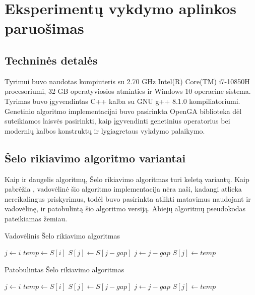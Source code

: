 \documentclass{VUMIFInfKursinis}
\begin{document}
\section{Eksperimentų vykdymo aplinkos paruošimas}

\subsection{Techninės detalės}
Tyrimui buvo naudotas kompiuteris su 2.70 GHz Intel(R) Core(TM) i7-10850H procesoriumi,
32 GB operatyviosios atminties ir Windows 10 operacine sistema.
Tyrimas buvo įgyvendintas C++ kalba su GNU g++ 8.1.0 kompiliatoriumi.
Genetinio algoritmo implementacijai buvo pasirinkta OpenGA biblioteka \cite{mohammadi2017openga}
dėl suteikiamos laisvės pasirinkti, kaip įgyvendinti genetinius operatorius bei modernių kalbos konstruktų ir lygiagretaus vykdymo palaikymo.

\subsection{Šelo rikiavimo algoritmo variantai}

Kaip ir daugelis algoritmų, Šelo rikiavimo algoritmas turi keletą variantų.
Kaip pabrėžia \cite{Radavičius_Baranauskas_2013}, vadovėlinė šio algoritmo implementacija nėra
naši, kadangi atlieka nereikalingus priskyrimus,
todėl buvo pasirinkta atlikti matavimus naudojant ir vadovėlinę, ir patobulintą šio algoritmo versiją.
Abiejų algoritmų pseudokodas pateikiamas žemiau.

\begin{algorithm}
  \caption{Vadovėlinis Šelo rikiavimo algoritmas}\label{css} %
  \begin{algorithmic}[1]
      \State $j\gets i$
      \State $temp\gets S[i]$
        \State $S[j]\gets S[j - gap]$
        \State $j\gets j-gap$
      \EndWhile
      \State $S[j]\gets temp$
    \EndFor
  \EndFor
  \end{algorithmic}
\end{algorithm}

\begin{algorithm}
  \caption{Patobulintas Šelo rikiavimo algoritmas}\label{iss}
  \begin{algorithmic}[1]
        \State $j\gets i$
        \State $temp\gets S[i]$
        \Repeat
          \State $S[j]\gets S[j - gap]$
          \State $j\gets j-gap$
        \State $S[j]\gets temp$
      \EndIf
    \EndFor
  \EndFor
  \end{algorithmic}
\end{algorithm}
\end{document}
